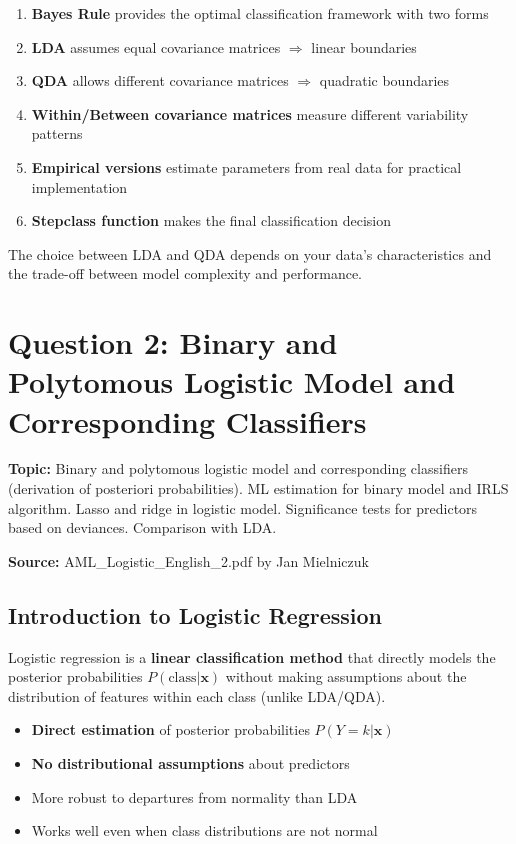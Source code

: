 \documentclass[12pt,a4paper]{article}
\begin{document}
\begin{enumerate}
    \item \textbf{Bayes Rule} provides the optimal classification framework with two forms
    \item \textbf{LDA} assumes equal covariance matrices $\Rightarrow$ linear boundaries
    \item \textbf{QDA} allows different covariance matrices $\Rightarrow$ quadratic boundaries
    \item \textbf{Within/Between covariance matrices} measure different variability patterns
    \item \textbf{Empirical versions} estimate parameters from real data for practical implementation
    \item \textbf{Stepclass function} makes the final classification decision
\end{enumerate}

The choice between LDA and QDA depends on your data's characteristics and the trade-off between model complexity and performance.

\newpage

\section{Question 2: Binary and Polytomous Logistic Model and Corresponding Classifiers}

\textbf{Topic:} Binary and polytomous logistic model and corresponding classifiers (derivation of posteriori probabilities). ML estimation for binary model and IRLS algorithm. Lasso and ridge in logistic model. Significance tests for predictors based on deviances. Comparison with LDA.

\textbf{Source:} AML\_Logistic\_English\_2.pdf by Jan Mielniczuk

\subsection{Introduction to Logistic Regression}

Logistic regression is a \textbf{linear classification method} that directly models the posterior probabilities $P(\text{class} | \mathbf{x})$ without making assumptions about the distribution of features within each class (unlike LDA/QDA).

\begin{tcolorbox}[colback=blue!5!white,colframe=blue!75!black,title=Key Advantages of Logistic Regression]
\begin{itemize}
    \item \textbf{Direct estimation} of posterior probabilities $P(Y=k|\mathbf{x})$
    \item \textbf{No distributional assumptions} about predictors
    \item More robust to departures from normality than LDA
    \item Works well even when class distributions are not normal
\end{itemize}
\end{tcolorbox}
\end{document}
